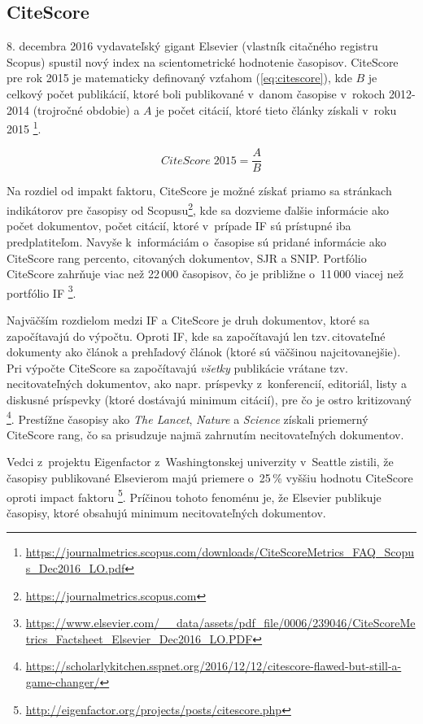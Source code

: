\subsection{CiteScore}
\label{sec:citescore}

8. decembra 2016 vydavateľský gigant Elsevier (vlastník citačného registru
Scopus) spustil nový index na scientometrické hodnotenie časopisov.  CiteScore
pre rok 2015 je matematicky definovaný vzťahom (\ref{eq:citescore}), kde $B$
je celkový počet publikácií, ktoré boli publikované v~danom časopise v~rokoch
2012-2014 (trojročné obdobie) a $A$ je počet citácií, ktoré tieto články
získali v~roku 2015
\footnote{\url{https://journalmetrics.scopus.com/downloads/CiteScoreMetrics_FAQ_Scopus_Dec2016_LO.pdf}}.

\begin{equation}
\label{eq:citescore}
CiteScore\; 2015 = \frac{A}{B}
\end{equation}

Na rozdiel od impakt faktoru, CiteScore je možné získať priamo sa stránkach
indikátorov pre časopisy od
Scopusu\footnote{\url{https://journalmetrics.scopus.com}}, kde sa dozvieme
ďalšie informácie ako počet dokumentov, počet citácií, ktoré v~prípade IF sú
prístupné iba predplatiteľom.  Navyše k~informáciám o~časopise sú pridané
informácie ako CiteScore rang percento, citovaných dokumentov, SJR a SNIP.
Portfólio CiteScore zahrňuje viac než 22\,000 časopisov, čo je približne o~11\,000
viacej než portfólio IF
\footnote{\url{https://www.elsevier.com/__data/assets/pdf_file/0006/239046/CiteScoreMetrics_Factsheet_Elsevier_Dec2016_LO.PDF}}.

Najväčším rozdielom medzi IF a CiteScore je druh dokumentov, ktoré sa
započítavajú do výpočtu. Oproti IF, kde sa započítavajú len tzv.\,citovateľné
dokumenty ako článok a prehľadový článok (ktoré sú väčšinou najcitovanejšie).
Pri výpočte CiteScore sa započítavajú \emph{všetky} publikácie vrátane tzv.
necitovateľných dokumentov, ako napr. príspevky z~konferencií, editoriál, listy
a diskusné príspevky (ktoré dostávajú minimum citácií), pre čo je ostro
kritizovaný
\footnote{\url{https://scholarlykitchen.sspnet.org/2016/12/12/citescore-flawed-but-still-a-game-changer/}}.
Prestížne časopisy ako \emph{The Lancet}, \emph{Nature} a \emph{Science}
získali priemerný CiteScore rang, čo sa prisudzuje najmä zahrnutím
necitovateľných dokumentov.

Vedci z~projektu Eigenfactor z~Washingtonskej univerzity v~Seattle zistili, že
časopisy publikované Elsevierom majú priemere o~25\,\% vyššiu hodnotu CiteScore
oproti impact faktoru
\footnote{\url{http://eigenfactor.org/projects/posts/citescore.php}}. Príčinou
tohoto fenoménu je, že Elsevier publikuje časopisy, ktoré obsahujú minimum
necitovateľných dokumentov.

